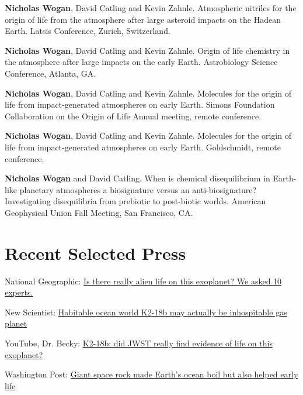 \documentclass[12pt]{article}
\begin{document}
\begin{cvlist}
\item[2022]
  \textbf{Nicholas Wogan}, David Catling and Kevin Zahnle. Atmospheric nitriles for the origin of life from the atmosphere after large asteroid impacts on the Hadean Earth. Latsis Conference, Zurich, Switzerland.
\item[2022]
  \textbf{Nicholas Wogan}, David Catling and Kevin Zahnle. Origin of life chemistry in the atmosphere after large impacts on the early Earth. Astrobiology Science Conference, Atlanta, GA.
\item[2021]
  \textbf{Nicholas Wogan}, David Catling and Kevin Zahnle. Molecules for the origin of life from impact-generated atmospheres on early Earth. Simons Foundation Collaboration on the Origin of Life Annual meeting, remote conference.
\item[2021]
  \textbf{Nicholas Wogan}, David Catling and Kevin Zahnle. Molecules for the origin of life from impact-generated atmospheres on early Earth. Goldschmidt, remote conference.
\item[2019]
  \textbf{Nicholas Wogan} and David Catling. When is chemical disequilibrium in Earth-like planetary atmospheres a biosignature versus an anti-biosignature? Investigating disequilibria from prebiotic to post-biotic worlds. American Geophysical Union Fall Meeting, San Francisco, CA.
\end{cvlist}

\section{Recent Selected Press}

\begin{cvlist}
\item[2025]
  National Geographic: \href{https://www.nationalgeographic.com/science/article/alien-planet-signs-life-biosignature-exoplanet}{Is there really alien life on this exoplanet? We asked 10 experts.}
\item[2024]
  New Scientist: \href{https://www.newscientist.com/article/2419474-habitable-ocean-world-k2-18b-may-actually-be-inhospitable-gas-planet/}{Habitable ocean world K2-18b may actually be inhospitable gas planet}
\item[2024]
  YouTube, Dr. Becky: \href{https://www.youtube.com/watch?v=r0lGz73rluo}{K2-18b: did JWST really find evidence of life on this exoplanet?}
\item[2023]
  Washington Post: \href{https://www.washingtonpost.com/science/2023/12/19/early-earth-life-impacts-ocean/}{Giant space rock made Earth's ocean boil but also helped early life}
\end{cvlist}
\end{document}
